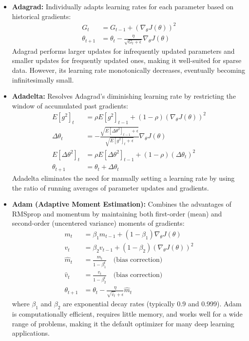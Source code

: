 \documentclass[a4paper, journal]{IEEEtran}
\begin{document}
\begin{itemize}
    \item \textbf{Adagrad:} Individually adapts learning rates for each parameter based on historical gradients:
          \begin{align}
              G_{t}        & = G_{t-1} + (\nabla_\theta J(\theta))^2                                 \\
              \theta_{t+1} & = \theta_t - \frac{\eta}{\sqrt{G_t + \epsilon}} \nabla_\theta J(\theta)
          \end{align}
          Adagrad performs larger updates for infrequently updated parameters and smaller updates for frequently updated ones, making it well-suited for sparse data. However, its learning rate monotonically decreases, eventually becoming infinitesimally small.

    \item \textbf{Adadelta:} Resolves Adagrad's diminishing learning rate by restricting the window of accumulated past gradients:
          \begin{align}
              E[g^2]_t            & = \rho E[g^2]_{t-1} + (1-\rho)(\nabla_\theta J(\theta))^2                                               \\
              \Delta\theta_t      & = -\frac{\sqrt{E[\Delta\theta^2]_{t-1} + \epsilon}}{\sqrt{E[g^2]_t + \epsilon}} \nabla_\theta J(\theta) \\
              E[\Delta\theta^2]_t & = \rho E[\Delta\theta^2]_{t-1} + (1-\rho)(\Delta\theta_t)^2                                             \\
              \theta_{t+1}        & = \theta_t + \Delta\theta_t
          \end{align}
          Adadelta eliminates the need for manually setting a learning rate by using the ratio of running averages of parameter updates and gradients.

    \item \textbf{Adam (Adaptive Moment Estimation):} Combines the advantages of RMSprop and momentum by maintaining both first-order (mean) and second-order (uncentered variance) moments of gradients:
          \begin{align}
              m_t          & = \beta_1 m_{t-1} + (1-\beta_1)\nabla_\theta J(\theta)         \\
              v_t          & = \beta_2 v_{t-1} + (1-\beta_2)(\nabla_\theta J(\theta))^2     \\
              \hat{m}_t    & = \frac{m_t}{1-\beta_1^t} \quad \text{(bias correction)}       \\
              \hat{v}_t    & = \frac{v_t}{1-\beta_2^t} \quad \text{(bias correction)}       \\
              \theta_{t+1} & = \theta_t - \frac{\eta}{\sqrt{\hat{v}_t} + \epsilon}\hat{m}_t
          \end{align}
          where $\beta_1$ and $\beta_2$ are exponential decay rates (typically 0.9 and 0.999). Adam is computationally efficient, requires little memory, and works well for a wide range of problems, making it the default optimizer for many deep learning applications.
\end{itemize}
\end{document}
